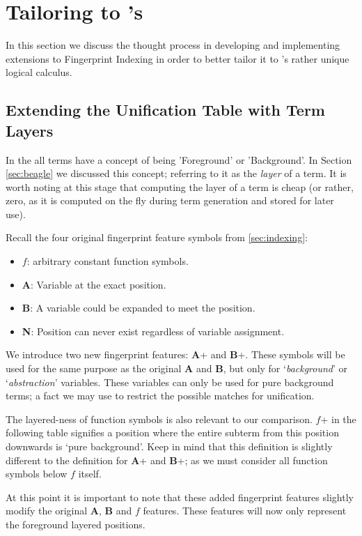 \section{Tailoring to \Beagle's \HSWAC}
\label{sec:tailored}

In this section we discuss the thought process in developing and implementing
extensions to Fingerprint Indexing in order to better tailor it to \beagle's
rather unique logical calculus.

\subsection{Extending the Unification Table with Term Layers}

In the {\HSWAC} all terms have 
a concept of being 'Foreground' or 'Background'. In Section \ref{sec:beagle} we
discussed this concept; referring to it as the \emph{layer} of a term. It is
worth noting at this stage that computing the layer of a term is cheap (or rather,
zero, as it is computed on the fly during term generation and stored for later use).

Recall the four original fingerprint feature symbols from \ref{sec:indexing}:
\begin{itemize}
\item $f$: arbitrary constant function symbols.
\item \textbf{A}: Variable at the exact position.
\item \textbf{B}: A variable could be expanded to meet the position.
\item \textbf{N}: Position can never exist regardless of variable assignment.
\end{itemize}
We introduce two new fingerprint features: \textbf{A}+ and \textbf{B}+.
These symbols will be used for the same purpose as the original \textbf{A} and \textbf{B}, but
only for `\emph{background}' or `\emph{abstraction}' variables. These variables
can only be used for pure background terms; a fact we may use to restrict the possible
matches for unification.

The layered-ness of function symbols is also relevant to our comparison.
$f$+ in the following table signifies a position where the entire subterm from this position downwards
is `pure background'. Keep in mind that this definition is slightly different
to the definition for \textbf{A}+ and \textbf{B}+; as we must consider all function
symbols below $f$ itself.

At this point it is important to note that these added fingerprint features slightly modify
the original \textbf{A}, \textbf{B} and $f$ features. These features will now
only represent the foreground layered positions.

